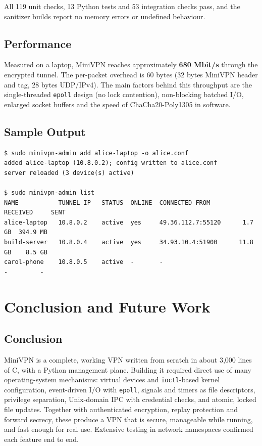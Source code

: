 \documentclass[12pt,a4paper]{report}
\begin{document}
All 119 unit checks, 13 Python tests and 53 integration checks pass, and the sanitizer
builds report no memory errors or undefined behaviour.

\section{Performance}
Measured on a laptop, MiniVPN reaches approximately \textbf{680 Mbit/s} through the
encrypted tunnel. The per-packet overhead is 60 bytes (32 bytes MiniVPN header and
tag, 28 bytes UDP/IPv4). The main factors behind this throughput are the single-threaded
\texttt{epoll} design (no lock contention), non-blocking batched I/O, enlarged socket
buffers and the speed of ChaCha20-Poly1305 in software.

\section{Sample Output}
\begin{lstlisting}[language={},numbers=none,basicstyle=\ttfamily\scriptsize,caption={Administration CLI}]
$ sudo minivpn-admin add alice-laptop -o alice.conf
added alice-laptop (10.8.0.2); config written to alice.conf
server reloaded (3 device(s) active)

$ sudo minivpn-admin list
NAME           TUNNEL IP   STATUS  ONLINE  CONNECTED FROM       RECEIVED     SENT
alice-laptop   10.8.0.2    active  yes     49.36.112.7:55120      1.7 GB  394.9 MB
build-server   10.8.0.4    active  yes     34.93.10.4:51900      11.8 GB    8.5 GB
carol-phone    10.8.0.5    active  -       -                          -         -
\end{lstlisting}


\chapter{Conclusion and Future Work}\label{ch:conclusion}

\section{Conclusion}
MiniVPN is a complete, working VPN written from scratch in about 3{,}000 lines of C,
with a Python management plane. Building it required direct use of many
operating-system mechanisms: virtual devices and \texttt{ioctl}-based kernel
configuration, event-driven I/O with \texttt{epoll}, signals and timers as file
descriptors, privilege separation, Unix-domain IPC with credential checks, and atomic,
locked file updates. Together with authenticated encryption, replay protection and
forward secrecy, these produce a VPN that is secure, manageable while running, and
fast enough for real use. Extensive testing in network namespaces confirmed each
feature end to end.
\end{document}
